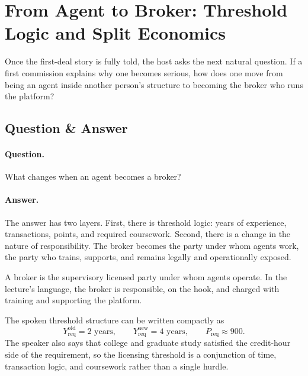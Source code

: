 \section{From Agent to Broker: Threshold Logic and Split Economics}

Once the first-deal story is fully told, the host asks the next natural question. If a first commission explains why one becomes serious, how does one move from being an agent inside another person's structure to becoming the broker who runs the platform?

\subsection{Question \& Answer}

\paragraph{Question.}
What changes when an agent becomes a broker?

\paragraph{Answer.}
The answer has two layers. First, there is threshold logic: years of experience, transactions, points, and required coursework. Second, there is a change in the nature of responsibility. The broker becomes the party under whom agents work, the party who trains, supports, and remains legally and operationally exposed.

\begin{definition}
A broker is the supervisory licensed party under whom agents operate. In the lecture's language, the broker is responsible, on the hook, and charged with training and supporting the platform.
\end{definition}

The spoken threshold structure can be written compactly as
\begin{equation}
Y_{\mathrm{req}}^{\mathrm{old}} = 2 \text{ years},
\qquad
Y_{\mathrm{req}}^{\mathrm{new}} = 4 \text{ years},
\qquad
P_{\mathrm{req}} \approx 900.
\end{equation}
The speaker also says that college and graduate study satisfied the credit-hour side of the requirement, so the licensing threshold is a conjunction of time, transaction logic, and coursework rather than a single hurdle.

